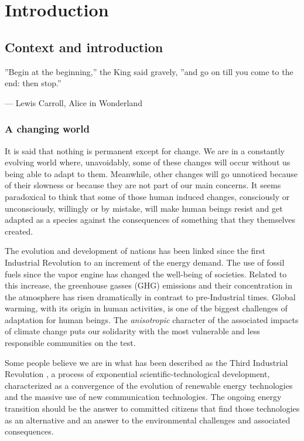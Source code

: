 \part{Introduction\label{cha:intro}}

\chapter{Context and introduction\label{context}}

\epigraphfontsize{\small\itshape}
\epigraph{''Begin at the beginning,'' the King said gravely, ''and go on till you
come to the end: then stop.''}{--- \textup{Lewis Carroll}, Alice in Wonderland}

\section{A changing world} 

It is said that nothing is permanent except for change. We are in a constantly evolving world where, unavoidably, some of these changes will occur without us being able to adapt to them. Meanwhile, other changes will go unnoticed because of their slowness or because they are not part of our main concerns. It seems paradoxical to think that some of those human induced changes, consciously or unconsciously, willingly or by mistake, will make human beings resist and get adapted as a species against the consequences of something that they themselves created. 

The evolution and development of nations has been linked since the first Industrial Revolution to an increment of the energy demand. The use of fossil fuels since the vapor engine has changed the well-being of societies. Related to this increase, the greenhouse gasses (GHG) emissions and their concentration in the atmosphere has risen dramatically in contrast to pre-Industrial times. Global warming, with its origin in human activities, is one of the biggest challenges of adaptation for human beings. The \textit{anisotropic} character of the associated impacts of climate change puts our solidarity with the most vulnerable and less responsible communities on the test.


Some people believe we are in what has been described as the Third Industrial Revolution \cite*{Rifkin2012}, a process of exponential scientific-technological development, characterized as a convergence of the evolution of renewable energy technologies and the massive use of new communication technologies. The ongoing energy transition should be the answer to committed citizens that find those technologies as an alternative and an answer to the environmental challenges and associated consequences.     

